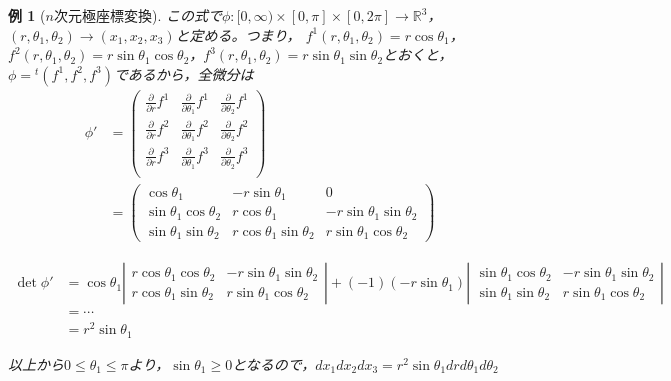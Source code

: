 \documentclass[dvipdfmx,a4j,10pt]{jsarticle}
\theoremstyle{mystyle1}
\theoremstyle{mystyle2}
\newtheorem{example}{例}
\begin{document}
\begin{example}[$n$次元極座標変換]
この式で$\phi:[0,\infty)\times[0,\pi]\times[0,2\pi]\to\mathbb{R}^3$，$(r,\theta_1,\theta_2)\to(x_1,x_2,x_3)$と定める。つまり，
$f^1(r,\theta_1,\theta_2)=r\cos\theta_1$，$f^2(r,\theta_1,\theta_2)= r\sin\theta_1\cos\theta_2 $，$f^3(r,\theta_1,\theta_2)= r\sin\theta_1\sin\theta_2$とおくと，$\phi={}^t(f^1,f^2,f^3)$であるから，全微分は
\[
    \begin{split}
	\phi'&=
	\begin{pmatrix}
	\frac{\partial}{\partial r}f^1 & \frac{\partial}{\partial \theta_1}f^1 & \frac{\partial}{\partial \theta_2}f^1 \\
	\frac{\partial}{\partial r}f^2 & \frac{\partial}{\partial \theta_1}f^2 & \frac{\partial}{\partial \theta_2}f^2 \\
	\frac{\partial}{\partial r}f^3 & \frac{\partial}{\partial \theta_1}f^3 & \frac{\partial}{\partial \theta_2}f^3 \\
	\end{pmatrix} \\
&=
\begin{pmatrix}
\cos\theta_1 & -r\sin\theta_1 & 0 \\
\sin\theta_1\cos\theta_2 & r\cos\theta_1 & -r\sin\theta_1\sin\theta_2 \\
\sin\theta_1\sin\theta_2 & r\cos\theta_1\sin\theta_2 & r\sin\theta_1\cos\theta_2
\end{pmatrix}
    \end{split}
\]

\[
\begin{split}
\det \phi' &= \cos\theta_1
\left|\begin{array}{cc}
r\cos\theta_1\cos\theta_2 & -r\sin\theta_1\sin\theta_2 \\
r\cos\theta_1\sin\theta_2 & r\sin\theta_1\cos\theta_2
\end{array}\right|
+
(-1)(-r\sin\theta_1)
\left|\begin{array}{cc}
\sin\theta_1\cos\theta_2 & -r\sin\theta_1\sin\theta_2 \\
\sin\theta_1\sin\theta_2 & r\sin\theta_1\cos\theta_2
\end{array}\right| \\
&=\cdots \\
&=r^2\sin\theta_1
\end{split}
\]

以上から$0\leq\theta_1\leq\pi$より，$\sin\theta_1\geq 0$となるので，$dx_1dx_2dx_3=r^2\sin\theta_1drd\theta_1d\theta_2$

\end{example}
\end{document}
